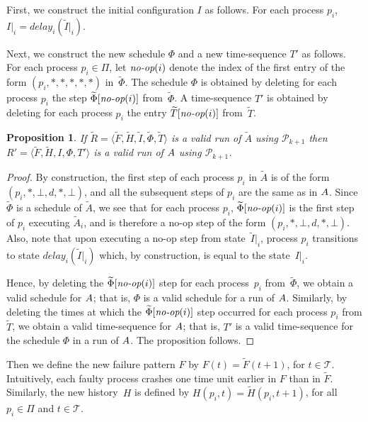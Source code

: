 \documentclass[11pt]{article}
\newtheorem{proposition}{Proposition}[section]
\newcommand{\ident}[1]{\textit{#1}\rule{0cm}{1ex}}
\newcommand{\T}{\mathcal{T}}
\newcommand{\PFD}{\ensuremath{\mathcal{P}}}
\newcommand{\TrAlg}{\widetilde{A}}
\begin{document}
First, we construct the initial configuration $I$ as follows.
For each process $p_i$, $I|_i = delay_i(\widetilde{I}|_i)$.

Next, we construct the new schedule $\Phi$ and a new time-sequence
     $T'$ as follows.
For each process $p_i \in \Pi$, let $\ident{no-op}(i)$ denote the
     index of the first entry of the form $(p_i,*,*,*,*,*)$
     in~$\widetilde{\Phi}$.
The schedule $\Phi$ is obtained by deleting for each process $p_i$ the
     step $\widetilde{\Phi}[\ident{no-op}(i)]$
     from~$\widetilde{\Phi}$.
A time-sequence $T'$ is obtained by deleting for each process $p_i$
     the entry $\widetilde{T}[\ident{no-op}(i)]$ from~$\widetilde{T}$.

\begin{proposition}\label{lem:RprimeIsARunOfAlg}
If $\widetilde{R}=\langle \widetilde{F}, \widetilde{H}, \widetilde{I},
     \widetilde{\Phi}, \widetilde{T} \rangle$ is a valid run of
     $\TrAlg$ using $\PFD_{k+1}$ then $R'=\langle \widetilde{F},
     \widetilde{H}, I, \Phi, T' \rangle$ is a valid run of $A$
     using $\PFD_{k+1}$.
\end{proposition}

\begin{proof}
By construction, the first step of each process $p_i$ in $\TrAlg$ is
     of the form $(p_i,*,\bot,d,*,\bot)$, and all the subsequent steps
     of $p_i$ are the same as in $A$.
Since $\widetilde{\Phi}$ is a schedule of $\TrAlg$, we see that for
     each process $p_i$, $\widetilde{\Phi}[\ident{no-op}(i)]$ is the
     first step of $p_i$ executing $\TrAlg_i$, and is therefore a
     no-op step of the form $(p_i,*,\bot,d,*,\bot)$.
Also, note that upon executing a no-op step from
     state~$\widetilde{I}|_i$, process $p_i$ transitions to state
     $delay_i(\widetilde{I}|_i)$ which, by construction, is equal to
     the state~$I|_i$.  

Hence, by deleting the $\widetilde{\Phi}[\ident{no-op}(i)]$ step for each
     process~$p_i$ from~$\widetilde{\Phi}$, we obtain a valid schedule
     for $A$; that is, $\Phi$ is a valid schedule for a run of
     $A$.
Similarly, by deleting the times at which the
     $\widetilde{\Phi}[\ident{no-op}(i)]$ step occurred for each process $p_i$
     from $\widetilde{T}$, we obtain a valid time-sequence for $A$;
     that is, $T'$ is a valid time-sequence for the schedule $\Phi$ in
     a run of $A$.
The proposition follows.
\end{proof}


Then we define the new failure pattern $F$ by $F(t) =
     \widetilde{F}(t+1)$, for $t \in \T$.
Intuitively, each faulty process crashes one time unit earlier in $F$
     than in $\widetilde{F}$.
Similarly, the new history~$H$ is defined by $H(p_i,t) =
     \widetilde{H}(p_i,t+1)$, for all $p_i \in \Pi$ and $t \in \T$.
\end{document}
